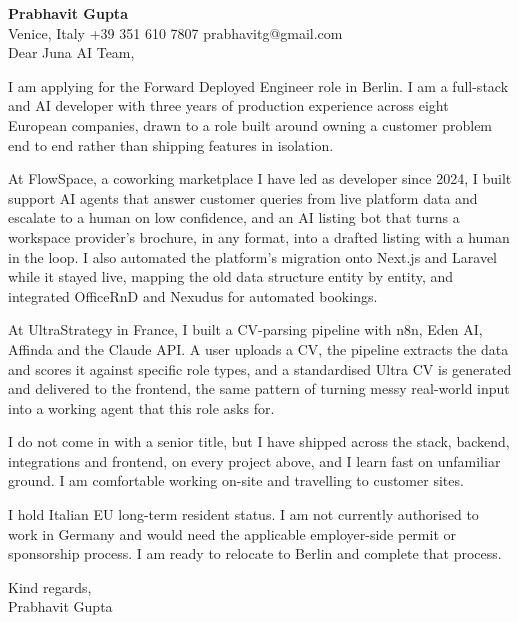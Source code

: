 \documentclass[a4paper,10.5pt]{article}
\begin{document}
\textbf{Prabhavit Gupta}\\
Venice, Italy \textbar{} +39 351 610 7807 \textbar{} prabhavitg@gmail.com\\[10pt]
Dear Juna AI Team,

I am applying for the Forward Deployed Engineer role in Berlin. I am a full-stack and AI developer with three years of production experience across eight European companies, drawn to a role built around owning a customer problem end to end rather than shipping features in isolation.

At FlowSpace, a coworking marketplace I have led as developer since 2024, I built support AI agents that answer customer queries from live platform data and escalate to a human on low confidence, and an AI listing bot that turns a workspace provider's brochure, in any format, into a drafted listing with a human in the loop. I also automated the platform's migration onto Next.js and Laravel while it stayed live, mapping the old data structure entity by entity, and integrated OfficeRnD and Nexudus for automated bookings.

At UltraStrategy in France, I built a CV-parsing pipeline with n8n, Eden AI, Affinda and the Claude API. A user uploads a CV, the pipeline extracts the data and scores it against specific role types, and a standardised Ultra CV is generated and delivered to the frontend, the same pattern of turning messy real-world input into a working agent that this role asks for.

I do not come in with a senior title, but I have shipped across the stack, backend, integrations and frontend, on every project above, and I learn fast on unfamiliar ground. I am comfortable working on-site and travelling to customer sites.

I hold Italian EU long-term resident status. I am not currently authorised to work in Germany and would need the applicable employer-side permit or sponsorship process. I am ready to relocate to Berlin and complete that process.

Kind regards,\\
Prabhavit Gupta
\end{document}
